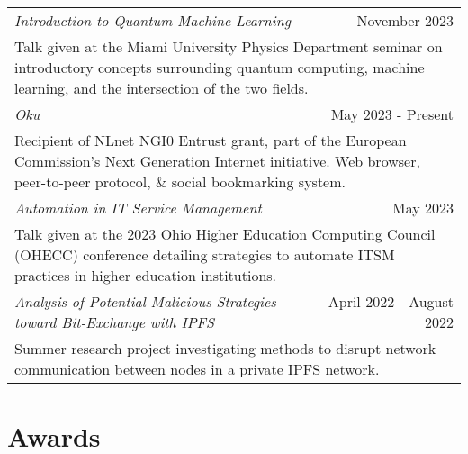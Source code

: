 \documentclass[letterpaper,8pt]{article} %
\begin{document}
\begin{tabular*}{\linewidth}{@{\extracolsep{\fill}} lr }
\emph{Introduction to Quantum Machine Learning} & November 2023\\
\multicolumn{2}{p{\linewidth}}{Talk given at the Miami University Physics Department seminar on introductory concepts surrounding quantum computing, machine learning, and the intersection of the two fields.}\\
\emph{Oku} & May 2023 - Present\\
\multicolumn{2}{p{\linewidth}}{Recipient of NLnet NGI0 Entrust grant, part of the European Commission's Next Generation Internet initiative. Web browser, peer-to-peer protocol, \& social bookmarking system.}\\
\emph{Automation in IT Service Management} & May 2023\\
\multicolumn{2}{p{\linewidth}}{Talk given at the 2023 Ohio Higher Education Computing Council (OHECC) conference detailing strategies to automate ITSM practices in higher education institutions.}\\
\emph{Analysis of Potential Malicious Strategies toward Bit-Exchange with IPFS} & April 2022 - August 2022\\
\multicolumn{2}{p{\linewidth}}{Summer research project investigating methods to disrupt network communication between nodes in a private IPFS network.}\\
\end{tabular*}


\section{Awards}
\end{document}
